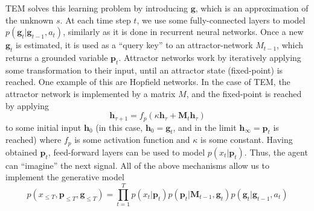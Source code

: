 \documentclass[12pt]{article}
\begin{document}
TEM solves this learning problem by introducing  $\boldsymbol{g}$, which is an approximation of the unknown $s$. At each time step $t$, we use some fully-connected layers to model $p(\boldsymbol{g}_{t}|\boldsymbol{g}_{t-1},a_t)$, similarly as it is done in recurrent neural networks. Once a new $\boldsymbol{g}_{t}$ is estimated, it is used as a ``query key'' to an attractor-network $M_{t-1}$, which returns a grounded variable $\boldsymbol{p}_{t}$. Attractor networks work by iteratively applying some transformation to their input, until an attractor state (fixed-point) is reached. One example of this are Hopfield networks. In the case of TEM, the attractor network is implemented by a matrix $M$, and the fixed-point is reached by applying
\[
\boldsymbol{h}_{\tau+1} = f_p(\kappa \boldsymbol{h}_{\tau}+\boldsymbol{M}_t \boldsymbol{h}_{\tau})
\]
to some initial input $\boldsymbol{h}_0$ (in this case, $\boldsymbol{h}_0=\boldsymbol{g}_{t}$, and in the limit $\boldsymbol{h}_{\infty}=\boldsymbol{p}_{t}$ is reached) where $f_p$ is some activation function and $\kappa$ is some constant. Having obtained $\boldsymbol{p}_{t}$,  feed-forward layers can be used to model $p(x_{t}| \boldsymbol{p}_{t})$. Thus, the agent can ``imagine'' the next signal. All of the above mechanisms allow us to implement the generative model
\[
p(x_{\le T},\boldsymbol{p}_{\le T}, \boldsymbol{g}_{\le T}) = \prod_{t=1}^T p(x_{t}|\boldsymbol{p}_{t}) p(\boldsymbol{p}_{t}|\boldsymbol{M}_{t-1},\boldsymbol{g}_{t})p(\boldsymbol{g}_{t}|\boldsymbol{g}_{t-1},a_t)
\]
\end{document}
